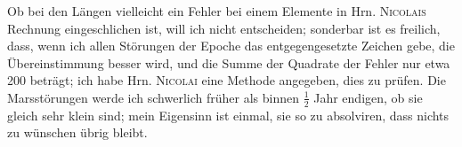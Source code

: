 \par{}Ob bei den Längen vielleicht ein Fehler bei einem Elemente in Hrn. \textsc{Nicolais} Rechnung eingeschlichen ist, will ich nicht entscheiden; sonderbar ist es freilich, dass, wenn ich allen Störungen der Epoche das entgegengesetzte Zeichen gebe, die Übereinstimmung  besser wird, und die Summe der Quadrate der Fehler nur etwa 200 beträgt; ich habe Hrn. \textsc{Nicolai} eine Methode angegeben, dies zu prüfen. Die Marsstörungen werde ich schwerlich früher als binnen \(\frac{1}{2}\) Jahr endigen, ob sie gleich sehr klein sind; mein Eigensinn ist einmal, sie so zu absolviren, dass nichts zu wünschen übrig bleibt.
\par
